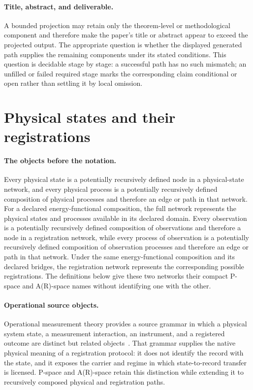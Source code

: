 \documentclass[11pt]{article}
\theoremstyle{definition}
\begin{document}
\paragraph{Title, abstract, and deliverable.}
A bounded projection may retain only the theorem-level or methodological component
and therefore make the paper's title or abstract appear to exceed the projected
output. The appropriate question is whether the displayed generated path supplies
the remaining components under its stated conditions. This question is decidable
stage by stage: a successful path has no such mismatch; an unfilled or failed
required stage marks the corresponding claim conditional or open rather than
settling it by local omission.

\section{Physical states and their registrations}
\label{supp:spaces}

\paragraph{The objects before the notation.}
Every physical state is a potentially recursively defined node in a physical-state
network, and every physical process is a potentially recursively defined
composition of physical processes and therefore an edge or path in that network.
For a declared energy-functional composition, the full network represents the
physical states and processes available in its declared domain. Every observation
is a potentially recursively defined composition of observations and therefore a
node in a registration network, while every process of observation is a potentially
recursively defined composition of observation processes and therefore an edge or
path in that network. Under the same energy-functional composition and its declared
bridges, the registration network represents the corresponding possible
registrations. The definitions below give these two networks their compact P-space
and A(R)-space names without identifying one with the other.


\paragraph{Operational source objects.}
Operational measurement theory provides a source grammar in which a physical
system state, a measurement interaction, an instrument, and a registered outcome
are distinct but related objects~\cite{S_DaviesLewis1970,S_Ozawa1984}. That grammar
supplies the native physical meaning of a registration protocol: it does not
identify the record with the state, and it exposes the carrier and regime in which
state-to-record transfer is licensed. P-space and A(R)-space retain this distinction
while extending it to recursively composed physical and registration paths.
\end{document}
